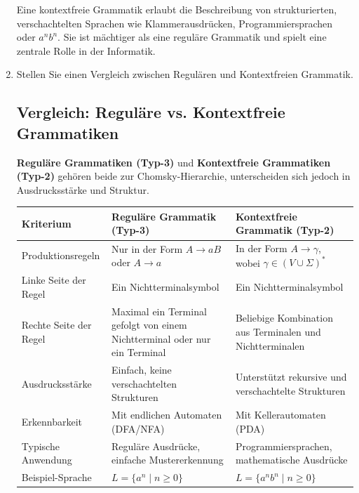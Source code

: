 \documentclass[a4paper,12pt]{article}
\begin{document}
\begin{enumerate}
			Eine kontextfreie Grammatik erlaubt die Beschreibung von strukturierten, verschachtelten Sprachen wie Klammerausdrücken, Programmiersprachen oder \( a^n b^n \). Sie ist mächtiger als eine reguläre Grammatik und spielt eine zentrale Rolle in der Informatik.
			
			\item Stellen Sie einen Vergleich zwischen Regulären und Kontextfreien Grammatik.\\
			\subsection*{Vergleich: Reguläre vs. Kontextfreie Grammatiken}
			
			\textbf{Reguläre Grammatiken (Typ-3)} und \textbf{Kontextfreie Grammatiken (Typ-2)} gehören beide zur Chomsky-Hierarchie, unterscheiden sich jedoch in Ausdrucksstärke und Struktur.
			
			\vspace{1em}
			
			\begin{tabularx}{\textwidth}{|l|X|X|}
				\hline
				\textbf{Kriterium} & \textbf{Reguläre Grammatik (Typ-3)} & \textbf{Kontextfreie Grammatik (Typ-2)} \\
				\hline
				Produktionsregeln & Nur in der Form \( A \rightarrow aB \) oder \( A \rightarrow a \) & In der Form \( A \rightarrow \gamma \), wobei \( \gamma \in (V \cup \Sigma)^* \) \\
				\hline
				Linke Seite der Regel & Ein Nichtterminalsymbol & Ein Nichtterminalsymbol \\
				\hline
				Rechte Seite der Regel & Maximal ein Terminal gefolgt von einem Nichtterminal oder nur ein Terminal & Beliebige Kombination aus Terminalen und Nichtterminalen \\
				\hline
				Ausdrucksstärke & Einfach, keine verschachtelten Strukturen & Unterstützt rekursive und verschachtelte Strukturen \\
				\hline
				Erkennbarkeit & Mit endlichen Automaten (DFA/NFA) & Mit Kellerautomaten (PDA) \\
				\hline
				Typische Anwendung & Reguläre Ausdrücke, einfache Mustererkennung & Programmiersprachen, mathematische Ausdrücke \\
				\hline
				Beispiel-Sprache & \( L = \{a^n \mid n \geq 0\} \) & \( L = \{a^n b^n \mid n \geq 0\} \) \\
				\hline
			\end{tabularx}
			

\end{enumerate}
\end{document}
